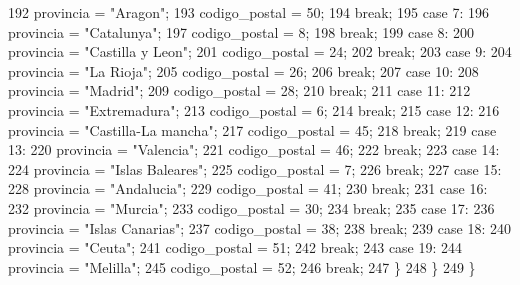 \begin{DoxyCode}
192                     provincia = \textcolor{stringliteral}{"Aragon"};
193                     codigo\_postal = 50;
194                     \textcolor{keywordflow}{break};
195                     \textcolor{keywordflow}{case} 7:
196                     provincia = \textcolor{stringliteral}{"Catalunya"};
197                     codigo\_postal = 8;
198                     \textcolor{keywordflow}{break};
199                     \textcolor{keywordflow}{case} 8:
200                     provincia = \textcolor{stringliteral}{"Castilla y Leon"};
201                     codigo\_postal = 24;
202                     \textcolor{keywordflow}{break};
203                     \textcolor{keywordflow}{case} 9:
204                     provincia = \textcolor{stringliteral}{"La Rioja"};
205                     codigo\_postal = 26;
206                     \textcolor{keywordflow}{break};
207                     \textcolor{keywordflow}{case} 10:
208                     provincia = \textcolor{stringliteral}{"Madrid"};
209                     codigo\_postal = 28;
210                     \textcolor{keywordflow}{break};
211                     \textcolor{keywordflow}{case} 11:
212                     provincia = \textcolor{stringliteral}{"Extremadura"};
213                     codigo\_postal = 6;
214                     \textcolor{keywordflow}{break};
215                     \textcolor{keywordflow}{case} 12:
216                     provincia = \textcolor{stringliteral}{"Castilla-La mancha"};
217                     codigo\_postal = 45;
218                     \textcolor{keywordflow}{break};
219                     \textcolor{keywordflow}{case} 13:
220                     provincia = \textcolor{stringliteral}{"Valencia"};
221                     codigo\_postal = 46;
222                     \textcolor{keywordflow}{break};
223                     \textcolor{keywordflow}{case} 14:
224                     provincia = \textcolor{stringliteral}{"Islas Baleares"};
225                     codigo\_postal = 7;
226                     \textcolor{keywordflow}{break};
227                     \textcolor{keywordflow}{case} 15:
228                     provincia = \textcolor{stringliteral}{"Andalucia"};
229                     codigo\_postal = 41;
230                     \textcolor{keywordflow}{break};
231                     \textcolor{keywordflow}{case} 16:
232                     provincia = \textcolor{stringliteral}{"Murcia"};
233                     codigo\_postal = 30;
234                     \textcolor{keywordflow}{break};
235                     \textcolor{keywordflow}{case} 17:
236                     provincia = \textcolor{stringliteral}{"Islas Canarias"};
237                     codigo\_postal = 38;
238                     \textcolor{keywordflow}{break};
239                     \textcolor{keywordflow}{case} 18:
240                     provincia = \textcolor{stringliteral}{"Ceuta"};
241                     codigo\_postal = 51;
242                     \textcolor{keywordflow}{break};
243                     \textcolor{keywordflow}{case} 19:
244                     provincia = \textcolor{stringliteral}{"Melilla"};
245                     codigo\_postal = 52;
246                     \textcolor{keywordflow}{break};
247             \}
248             \}
249     \}
\end{DoxyCode}
